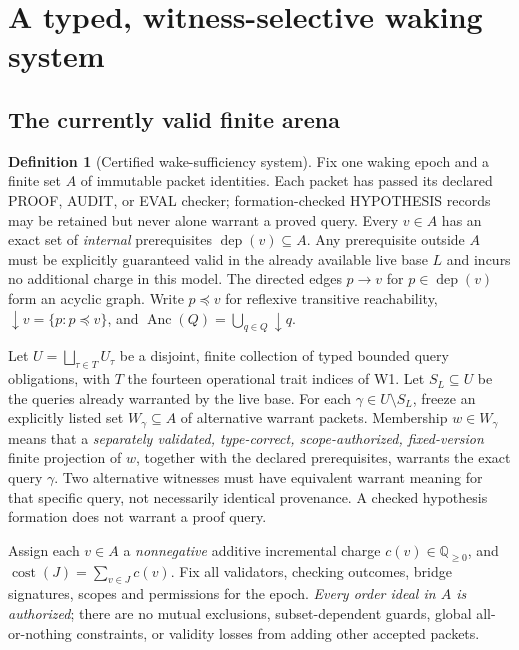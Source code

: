 \documentclass[10pt,letterpaper]{article}
\theoremstyle{definition}
\newtheorem{definition}[theorem]{Definition}
\theoremstyle{remark}
\newcommand{\Anc}{\operatorname{Anc}}
\newcommand{\dep}{\operatorname{dep}}
\newcommand{\cost}{\operatorname{cost}}
\begin{document}
\section{A typed, witness-selective waking system}\label{gl-first-W2-s2}
\subsection{The currently valid finite arena}
\begin{definition}[Certified wake-sufficiency system]
Fix one waking epoch and a finite set $A$ of immutable packet identities. Each packet has passed its declared \textsc{PROOF}, \textsc{AUDIT}, or \textsc{EVAL} checker; formation-checked \textsc{HYPOTHESIS} records may be retained but never alone warrant a proved query. Every $v\in A$ has an exact set of \emph{internal} prerequisites $\dep(v)\subseteq A$. Any prerequisite outside $A$ must be explicitly guaranteed valid in the already available live base $L$ and incurs no additional charge in this model. The directed edges $p\to v$ for $p\in\dep(v)$ form an acyclic graph. Write $p\preceq v$ for reflexive transitive reachability, $\downarrow v=\{p:p\preceq v\}$, and $\Anc(Q)=\bigcup_{q\in Q}\downarrow q$.

Let $U=\bigsqcup_{\tau\in T}U_\tau$ be a disjoint, finite collection of typed bounded query obligations, with $T$ the fourteen operational trait indices of W1. Let $S_L\subseteq U$ be the queries already warranted by the live base. For each $\gamma\in U\setminus S_L$, freeze an explicitly listed set $W_\gamma\subseteq A$ of alternative warrant packets. Membership $w\in W_\gamma$ means that a \emph{separately validated, type-correct, scope-authorized, fixed-version} finite projection of $w$, together with the declared prerequisites, warrants the exact query $\gamma$. Two alternative witnesses must have equivalent warrant meaning for that specific query, not necessarily identical provenance. A checked hypothesis formation does not warrant a proof query.

Assign each $v\in A$ a \emph{nonnegative} additive incremental charge $c(v)\in\mathbb Q_{\ge0}$, and $\cost(J)=\sum_{v\in J}c(v)$. Fix all validators, checking outcomes, bridge signatures, scopes and permissions for the epoch. \emph{Every order ideal in $A$ is authorized}; there are no mutual exclusions, subset-dependent guards, global all-or-nothing constraints, or validity losses from adding other accepted packets.
\end{definition}
\end{document}
